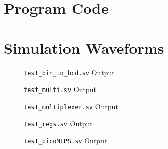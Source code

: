\clearpage
\begin{appendices}
	
\section{Program Code} \label{app:prog-code}
	



\section{Simulation Waveforms} \label{app:sim-waveforms}




\begin{figure}[ht]
	\centering
	
	\caption{\texttt{test\_bin\_to\_bcd.sv} Output}
	\label{fig:test-bin-bcd}
\end{figure}

\begin{figure}[ht]
	\centering
	
	\caption{\texttt{test\_multi.sv} Output}
	\label{fig:test-multi}
\end{figure}

\begin{figure}[ht]
	\centering
	
	\caption{\texttt{test\_multiplexer.sv} Output}
	\label{fig:test-mux}
\end{figure}

\begin{figure}[ht]
	\centering
	
	\caption{\texttt{test\_regs.sv} Output}
	\label{fig:test-regs}
\end{figure}

\begin{figure}[ht]
	\centering
	
	\caption{\texttt{test\_picoMIPS.sv} Output}
	\label{fig:test-picomips}
\end{figure}

\end{appendices}